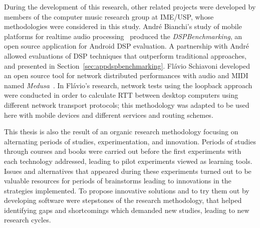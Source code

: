 During the development of this research, other related projects were developed by members of the computer music research group at IME/USP, whose methodologies were considered in this study.
André Bianchi's study of mobile platforms for realtime audio processing~\cite{Bianchi2012ontheperformance} produced the \textit{DSPBenchmarking}, an open source application for Android DSP evaluation.
A partnership with André allowed evaluations of DSP techniques that outperform traditional approaches, and presented in Section~\ref{sec:appdspbenchmarking}.
Flávio Schiavoni developed an open source tool for network distributed performances with audio and MIDI named \textit{Medusa}~\cite{Schiavoni2011medusa}.
In Flávio's research, network tests using the loopback approach were conducted in order to calculate RTT between desktop computers using different network transport protocols; this methodology was adapted to be used here with mobile devices and different services and routing schemes.




This thesis is also the result of an organic research methodology focusing on alternating periods of studies, experimentation, and innovation.
Periods of studies through courses and books were carried out before the first experiments with each technology addressed, leading to pilot experiments viewed as learning tools.
Issues and alternatives that appeared during these experiments turned out to be valuable resources for periods of brainstorms leading to innovations in the strategies implemented.
To propose innovative solutions and to try them out by developing software were stepstones of the research methodology, that helped identifying gaps and shortcomings which demanded new studies, leading to new research cycles.

